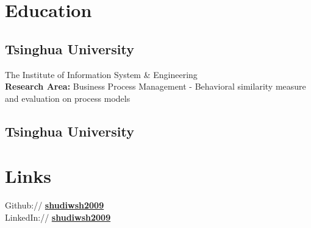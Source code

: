 \documentclass[]{resume_en}
\begin{document}
%
%

%
%

%
%

\begin{minipage}[t]{0.33\textwidth} 


\section{Education} 

\subsection{Tsinghua University}
The Institute of Information System \& Engineering\\
{\bf Research Area:} Business Process Management - Behavioral similarity measure and evaluation on process models
\sectionsep

\subsection{Tsinghua University}
\sectionsep


\section{Links} 
Github:// \href{https://github.com/shudiwsh2009}{\bf shudiwsh2009} \\
LinkedIn://  \href{https://cn.linkedin.com/in/shudiwsh2009}{\bf shudiwsh2009} \\
\sectionsep


\end{minipage}
\end{document}
